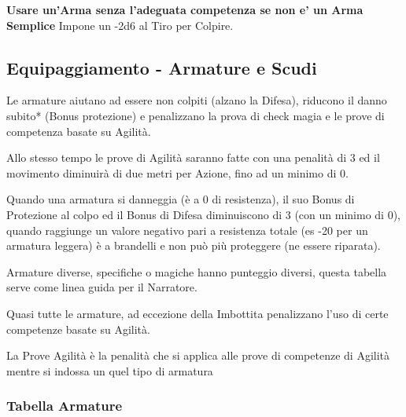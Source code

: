 \documentclass[a4paper,11pt,twoside,openany]{book}
\begin{document}
\medskip

\textbf{Usare un'Arma senza l'adeguata competenza se non e' un Arma Semplice}
Impone un -2d6 al Tiro per Colpire.

\medskip

\pagebreak

\subsection{Equipaggiamento - Armature e Scudi}

\label{equipaggiamento---armature-e-scudi}

Le armature aiutano ad essere non colpiti (alzano la Difesa), riducono il danno subito{*} (Bonus protezione) e penalizzano la prova di check magia e le prove di competenza basate su Agilità.

Allo stesso tempo le prove di Agilità saranno fatte con una penalità di 3 ed il movimento diminuirà di due metri per Azione, fino ad un minimo di 0.

Quando una armatura si danneggia (è a 0 di resistenza), il suo Bonus di Protezione al colpo ed il Bonus di Difesa diminuiscono di 3 (con un minimo di 0), quando raggiunge un valore negativo pari a resistenza totale (es -20 per un armatura leggera) è a brandelli e non può più proteggere (ne essere riparata).

Armature diverse, specifiche o magiche hanno punteggio diversi, questa tabella serve come linea guida per il Narratore.

Quasi tutte le armature, ad eccezione della Imbottita penalizzano l'uso di certe competenze basate su Agilità.

La Prove Agilità è la penalità che si applica alle prove di competenze di Agilità mentre si indossa un quel tipo di armatura

\subsubsection{Tabella Armature}
\medskip
\end{document}
